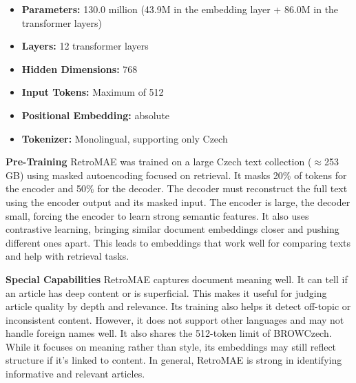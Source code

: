 \begin{itemize}
  \item \textbf{Parameters:} 130.0 million (43.9M in the embedding layer + 86.0M in the transformer layers)
  \item \textbf{Layers:} 12 transformer layers
  \item \textbf{Hidden Dimensions:} 768
  \item \textbf{Input Tokens:} Maximum of 512
  \item \textbf{Positional Embedding:} absolute
  \item \textbf{Tokenizer:} Monolingual, supporting only Czech
\end{itemize}

\textbf{Pre-Training}
\ac{RetroMAE} was trained on a large Czech text collection ($\approx$253 GB) using masked autoencoding focused on retrieval. It masks 20\% of tokens for the encoder and 50\% for the decoder. The decoder must reconstruct the full text using the encoder output and its masked input. The encoder is large, the decoder small, forcing the encoder to learn strong semantic features. It also uses contrastive learning, bringing similar document embeddings closer and pushing different ones apart. This leads to embeddings that work well for comparing texts and help with retrieval tasks.

\textbf{Special Capabilities}
\ac{RetroMAE} captures document meaning well. It can tell if an article has deep content or is superficial. This makes it useful for judging article quality by depth and relevance. Its training also helps it detect off-topic or inconsistent content. However, it does not support other languages and may not handle foreign names well. It also shares the 512-token limit of \ac{BROWCzech}. While it focuses on meaning rather than style, its embeddings may still reflect structure if it's linked to content. In general, \ac{RetroMAE} is strong in identifying informative and relevant articles.

